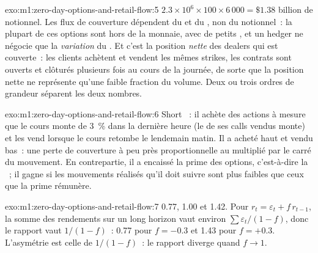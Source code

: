 \begin{solution}{exo:m1:zero-day-options-and-retail-flow:5}
$2.3 \times 10^6 \times 100 \times 6\,000 = \$1.38$ billion de notionnel. Les flux
de couverture dépendent du  et du , non du notionnel~: la plupart de ces options sont hors de la
monnaie, avec de petits , et un hedger ne négocie que la \emph{variation} du .
Et c'est la position \emph{nette} des dealers qui est couverte~: les clients achètent et vendent
les mêmes strikes, les contrats sont ouverts et clôturés plusieurs fois au cours de la
journée, de sorte que la position nette ne représente qu'une faible fraction du volume. Deux ou trois ordres de
grandeur séparent les deux nombres.
\end{solution}

\begin{solution}{exo:m1:zero-day-options-and-retail-flow:6}
Short ~: il achète des actions à mesure que le cours monte de 3~\% dans la dernière heure (le
 de ses calls vendus monte) et les vend lorsque le cours retombe le
lendemain matin. Il a acheté haut et vendu bas~: une perte de couverture à peu près proportionnelle au
 multiplié par le carré du mouvement. En contrepartie, il a encaissé la prime des options, c'est-à-dire la
~; il gagne si les mouvements réalisés qu'il doit
suivre sont plus faibles que ceux que la prime rémunère.
\end{solution}

\begin{solution}{exo:m1:zero-day-options-and-retail-flow:7}
0.77, 1.00 et 1.42. Pour $r_t = \varepsilon_t + f\,r_{t-1}$, la somme des rendements
sur un long horizon vaut environ $\sum\varepsilon_t/(1-f)$, donc le rapport vaut
$1/(1-f)$~: 0.77 pour $f = -0.3$ et 1.43 pour $f = +0.3$. L'asymétrie est
celle de $1/(1-f)$~: le rapport diverge quand $f \to 1$.
\end{solution}

